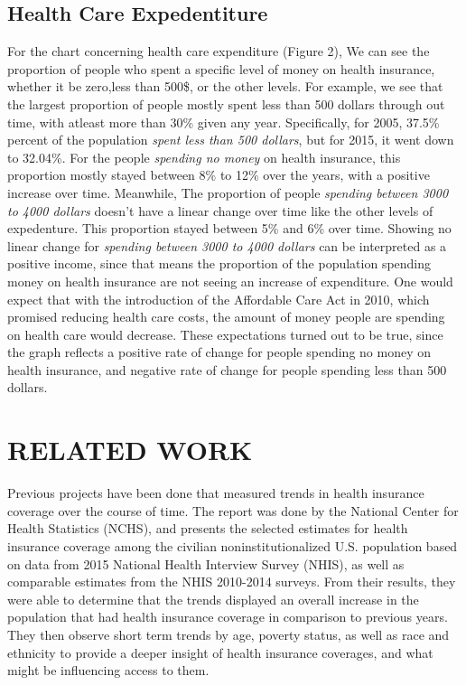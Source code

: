 \documentclass[10pt,]{article}
\begin{document}
\subsection{\texorpdfstring{\textbf{Health Care
Expedentiture}}{Health Care Expedentiture}}\label{health-care-expedentiture-1}

For the chart concerning health care expenditure (Figure 2), We can see
the proportion of people who spent a specific level of money on health
insurance, whether it be zero,less than 500\$, or the other levels. For
example, we see that the largest proportion of people mostly spent less
than 500 dollars through out time, with atleast more than 30\% given any
year. Specifically, for 2005, 37.5\% percent of the population
\emph{spent less than 500 dollars}, but for 2015, it went down to
32.04\%. For the people \emph{spending no money} on health insurance,
this proportion mostly stayed between 8\% to 12\% over the years, with a
positive increase over time. Meanwhile, The proportion of people
\emph{spending between 3000 to 4000 dollars} doesn't have a linear
change over time like the other levels of expedenture. This proportion
stayed between 5\% and 6\% over time. Showing no linear change for
\emph{spending between 3000 to 4000 dollars} can be interpreted as a
positive income, since that means the proportion of the population
spending money on health insurance are not seeing an increase of
expenditure. One would expect that with the introduction of the
Affordable Care Act in 2010, which promised reducing health care costs,
the amount of money people are spending on health care would decrease.
These expectations turned out to be true, since the graph reflects a
positive rate of change for people spending no money on health
insurance, and negative rate of change for people spending less than 500
dollars.

\section{RELATED WORK}\label{related-work}

Previous projects have been done that measured trends in health
insurance coverage over the course of time. The report was done by the
National Center for Health Statistics (NCHS), and presents the selected
estimates for health insurance coverage among the civilian
noninstitutionalized U.S. population based on data from 2015 National
Health Interview Survey (NHIS), as well as comparable estimates from the
NHIS 2010-2014 surveys. From their results, they were able to determine
that the trends displayed an overall increase in the population that had
health insurance coverage in comparison to previous years. They then
observe short term trends by age, poverty status, as well as race and
ethnicity to provide a deeper insight of health insurance coverages, and
what might be influencing access to them.
\end{document}
